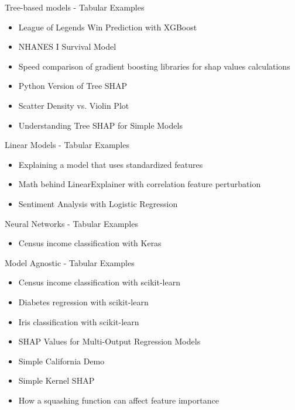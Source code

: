 \documentclass[aspectratio=169]{beamer}
\begin{document}
\begin{frame}{Tree-based models - Tabular Examples}
    \begin{itemize}
        \item League of Legends Win Prediction with XGBoost
        \item NHANES I Survival Model
        \item Speed comparison of gradient boosting libraries for shap values calculations
        \item Python Version of Tree \ac{SHAP}
        \item Scatter Density vs. Violin Plot
        \item Understanding Tree \ac{SHAP} for Simple Models
    \end{itemize}   
\end{frame}

\begin{frame}{Linear Models - Tabular Examples}
    \begin{itemize}
        \item Explaining a model that uses standardized features
        \item Math behind LinearExplainer with correlation feature perturbation
        \item Sentiment Analysis with Logistic Regression
    \end{itemize}   
\end{frame}

\begin{frame}{Neural Networks - Tabular Examples}
    \begin{itemize}
        \item Census income classification with Keras
    \end{itemize}   
\end{frame}

\begin{frame}{Model Agnostic - Tabular Examples}
    \begin{itemize}
        \item Census income classification with scikit-learn
        \item Diabetes regression with scikit-learn
        \item Iris classification with scikit-learn
        \item \ac{SHAP} Values for Multi-Output Regression Models
        \item Simple California Demo
        \item Simple Kernel \ac{SHAP}
        \item How a squashing function can affect feature importance
    \end{itemize}   
\end{frame}
\end{document}
